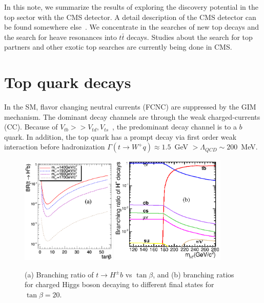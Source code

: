 \documentclass{cimento}
\begin{document}
In this note, we summarize the results of exploring the discovery
potential in the top sector with the CMS detector. A detail description
of the CMS detector can be found somewhere else~\cite{ref:CMS}. We concentrate
in the searches of new top decays and the search for heave resonances into
$t\bar{t}$ decays. Studies about the search for top partners and other exotic
top searches are currently being done in CMS.

\section{Top quark decays}
\label{sec:Decays}

In the SM, flavor changing neutral currents (FCNC) are suppressed by
the GIM mechanism. The dominant decay channels are through the
weak charged-currents (CC). Because of $V_{tb}>>V_{td},V_{ts}$~\cite{ref:pdg}, the 
predominant decay channel is to a $b$ quark. In addition, the top
quark has a prompt decay via first order weak interaction before
hadronization $\Gamma(t\rightarrow W^+ q) \approx 1.5$~GeV $> \Lambda_{QCD}
 \sim 200$~MeV.
 

\begin{figure}
\centering
\includegraphics[width=0.4\textwidth]{fig01a.ps}
\includegraphics[width=0.49\textwidth]{fig01b.ps}
\caption{(a) Branching ratio of $t\rightarrow H^{\pm}b$ vs $\tan \beta$,
and (b) branching ratios for charged Higgs boson decaying to different final
states for $\tan \beta=20$.}
\label{fig:fig1}
\end{figure}
\end{document}
